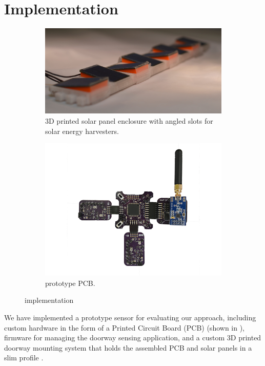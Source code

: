 \section{Implementation}
\label{sec:implementation}

\begin{figure}[t]
    \centering
    \begin{subfigure}[b]{0.5\textwidth}
        \centering
        \includegraphics[width=\columnwidth]{figs/panels_lossy.jpg}
        \caption{3D printed solar panel enclosure with angled slots for solar energy harvesters.}
        \label{fig:mounting}
    \end{subfigure}%
    \begin{subfigure}[b]{0.5\textwidth}
        \centering
        \includegraphics[width=0.75\columnwidth]{figs/board.png}
        \caption{ \sysname prototype PCB.}
        \label{fig:pcb}
    \end{subfigure}
    \caption{\sysname implementation \label{fig:prototype}}
\end{figure}


We have implemented a prototype \sysname sensor for evaluating our approach, including custom hardware in the form of a Printed Circuit Board (PCB) (shown in ), firmware for managing the doorway sensing application, and a custom 3D printed doorway mounting system that holds the assembled PCB and solar panels in a slim profile .

